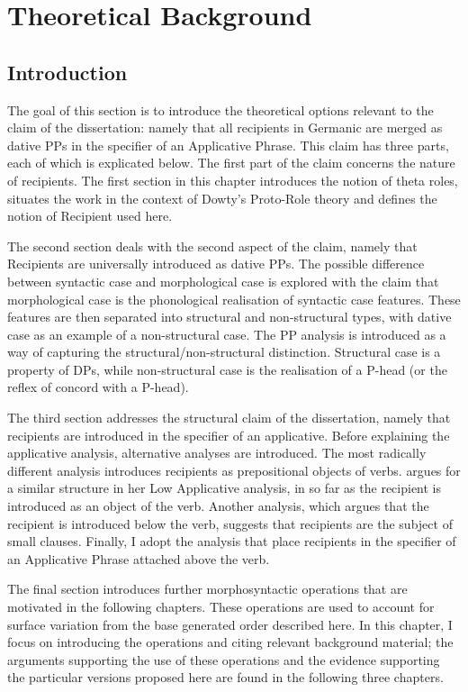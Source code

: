 \chapter{Theoretical Background}
\label{ch:theoryback}
\section{Introduction}
The goal of this section is to introduce the theoretical options relevant to the claim of the dissertation: namely that all recipients in Germanic are merged as dative PPs in the specifier of an Applicative Phrase. This claim has three parts, each of which is explicated below. The first part of the claim concerns the nature of recipients. The first section in this chapter introduces the notion of theta roles, situates the work in the context of Dowty's Proto-Role theory and defines the notion of Recipient used here.

The second section deals with the second aspect of the claim, namely that Recipients are universally introduced as dative PPs. The possible difference between syntactic case and morphological case is explored with the claim that morphological case is the phonological realisation of syntactic case features. These features are then separated into structural and non-structural types, with dative case as an example of a non-structural case. The PP analysis is introduced as a way of capturing the structural/non-structural distinction. Structural case is a property of DPs, while non-structural case is the realisation of a P-head (or the reflex of concord with a P-head).

The third section addresses the structural claim of the dissertation, namely that recipients are introduced in the specifier of an applicative. Before explaining the applicative analysis, alternative analyses are introduced. The most radically different analysis introduces recipients as prepositional objects of verbs. \cite{Pylkkanen.2001} argues for a similar structure in her Low Applicative analysis, in so far as the recipient is introduced as an object of the verb. Another analysis, which argues that the recipient is introduced below the verb, suggests that recipients are the subject of small clauses. Finally, I adopt the analysis that place recipients in the specifier of an Applicative Phrase attached above the verb.

The final section introduces further morphosyntactic operations that are motivated in the following chapters. These operations are used to account for surface variation from the base generated order described here. In this chapter, I focus on introducing the operations and citing relevant background material; the arguments supporting the use of these operations and the evidence supporting the particular versions proposed here are found in the following three chapters. 

